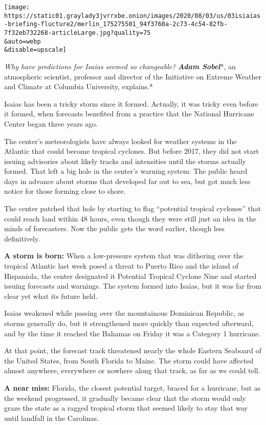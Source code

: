 \texttt{[image: https://static01.graylady3jvrrxbe.onion/images/2020/08/03/us/03isiaias-briefing-flucture2/merlin\_175275501\_94f3760a-2c73-4c54-82fb-7f32eb732268-articleLarge.jpg?quality=75\\\&auto=webp\\\&disable=upscale]}

\emph{Why have predictions for Isaias seemed so changeable?}
\emph{\textbf{Adam Sobel}}*, an atmospheric scientist, professor and
director of the Initiative on Extreme Weather and Climate at Columbia
University, explains.*

Isaias has been a tricky storm since it formed. Actually, it was tricky
even before it formed, when forecasts benefited from a practice that the
National Hurricane Center began three years ago.

The center's meteorologists have always looked for weather systems in
the Atlantic that could become tropical cyclones. But before 2017, they
did not start issuing advisories about likely tracks and intensities
until the storms actually formed. That left a big hole in the center's
warning system: The public heard days in advance about storms that
developed far out to sea, but got much less notice for those forming
close to shore.

The center patched that hole by starting to flag ``potential tropical
cyclones'' that could reach land within 48 hours, even though they were
still just an idea in the minds of forecasters. Now the public gets the
word earlier, though less definitively.

\textbf{A storm is born:} When a low-pressure system that was dithering
over the tropical Atlantic last week posed a threat to Puerto Rico and
the island of Hispaniola, the center designated it Potential Tropical
Cyclone Nine and started issuing forecasts and warnings. The system
formed into Isaias, but it was far from clear yet what its future held.

Isaias weakened while passing over the mountainous Dominican Republic,
as storms generally do, but it strengthened more quickly than expected
afterward, and by the time it reached the Bahamas on Friday it was a
Category 1 hurricane.

At that point, the forecast track threatened nearly the whole Eastern
Seaboard of the United States, from South Florida to Maine. The storm
could have affected almost anywhere, everywhere or nowhere along that
track, as far as we could tell.

\textbf{A near miss:} Florida, the closest potential target, braced for
a hurricane, but as the weekend progressed, it gradually became clear
that the storm would only graze the state as a ragged tropical storm
that seemed likely to stay that way until landfall in the Carolinas.

